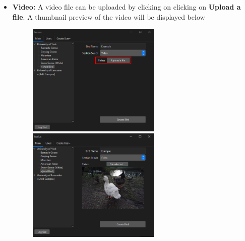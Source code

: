 \begin{enumerate}
\begin{itemize}
        \item \textbf{Video:}
        A video file can be uploaded by clicking on clicking on \textbf{Upload a file}. A thumbnail preview of the video will be displayed below
        \begin{figure}[H]
            \centering
            \includegraphics[width=0.6\textwidth]{MainTab/AddBird/addBirdVideo.PNG}
            \includegraphics[width=0.6\textwidth]{MainTab/AddBird/addBirdVideoSelected.PNG}
        \end{figure}
    \end{itemize}
    

\end{enumerate}
